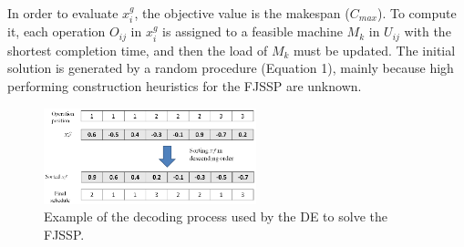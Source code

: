 In order to evaluate $x_i^g$, the objective value is the makespan ($C_{max}$). To compute it, each operation $O_{ij}$ in $x_i^g$ is assigned to a feasible machine $M_k$ in $U_{ij}$ with the shortest completion time, and then the load of $M_k$ must be updated. The initial solution is generated by a random procedure (Equation 1), mainly because high performing construction heuristics for the FJSSP are unknown.
%
%
%
\begin{figure}[tb]
    \centering
    \includegraphics[width=0.55\textwidth]{./figures/deco.eps}
    \caption{Example of the decoding process used by the DE to solve the FJSSP.}
    \label{fig:decodificacion}
    \vspace{-0.4cm}
\end{figure}
%
